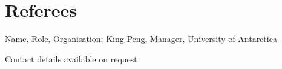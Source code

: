 \section*{Referees}
\insertlist
    {
        Name, Role, Organisation;
        King Peng, Manager, University of Antarctica
    }

\vspace{\baselineskip}
Contact details available on request